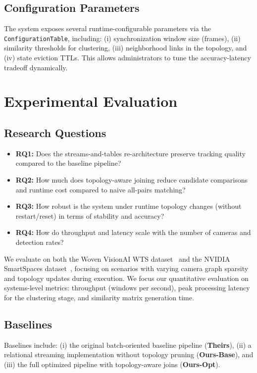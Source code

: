 \documentclass[11pt]{article}
\begin{document}
\subsection{Configuration Parameters}
The system exposes several runtime-configurable parameters via the \texttt{ConfigurationTable}, including: (i) synchronization window size (frames), (ii) similarity thresholds for clustering, (iii) neighborhood links in the topology, and (iv) state eviction TTLs. This allows administrators to tune the accuracy-latency tradeoff dynamically.

\section{Experimental Evaluation}\label{sec:evaluation}

\subsection{Research Questions}

\begin{itemize}[leftmargin=*]
    \item \textbf{RQ1:} Does the streams-and-tables re-architecture preserve tracking quality compared to the baseline pipeline?
    \item \textbf{RQ2:} How much does topology-aware joining reduce candidate comparisons and runtime cost compared to naive all-pairs matching?
    \item \textbf{RQ3:} How robust is the system under runtime topology changes (without restart/reset) in terms of stability and accuracy?
    \item \textbf{RQ4:} How do throughput and latency scale with the number of cameras and detection rates?
\end{itemize}
We evaluate on both the Woven VisionAI WTS dataset~\cite{woven2024wts} and the NVIDIA SmartSpaces dataset~\cite{aicity2025track1}, focusing on scenarios with varying camera graph sparsity and topology updates during execution. We focus our quantitative evaluation on systems-level metrics: throughput (windows per second), peak processing latency for the clustering stage, and similarity matrix generation time.

\subsection{Baselines}

Baselines include: (i) the original batch-oriented baseline pipeline (\textbf{Theirs}), (ii) a relational streaming implementation without topology pruning (\textbf{Ours-Base}), and (iii) the full optimized pipeline with topology-aware joins (\textbf{Ours-Opt}).
\end{document}
